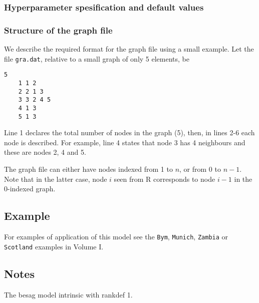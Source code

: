 \documentclass[a4paper,11pt]{article}
\begin{document}
\subsubsection*{Hyperparameter spesification and default values}



\subsubsection*{Structure of the graph file}

We describe the required format for the graph file using a small
example. Let the file {\tt gra.dat}, relative to a small graph of only
5 elements, be
\begin{lstlisting}[basicstyle=\footnotesize]
    5
    1 1 2
    2 2 1 3
    3 3 2 4 5 
    4 1 3
    5 1 3
\end{lstlisting}
Line 1 declares the total number of nodes in the graph (5), then, in
lines 2-6 each node is described. For example, line 4 states that node
3 has 4 neighbours and these are nodes 2, 4 and 5.

The graph file can either have nodes indexed from 1 to $n$, or from 0
to $n-1$. Note that in the latter case, node $i$ seen from R
corresponds to node $i-1$ in the 0-indexed graph.



\subsection*{Example}

For examples of application of this model see the {\tt Bym}, {\tt Munich}, {\tt Zambia} or {\tt Scotland} examples in Volume I.

\subsection*{Notes}

The besag model intrinsic with rankdef 1.
\end{document}
